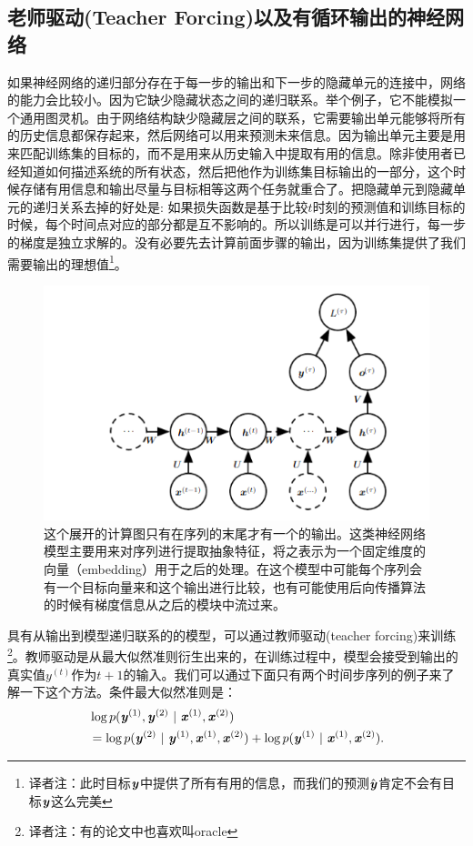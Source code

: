 \subsection{老师驱动(Teacher Forcing)以及有循环输出的神经网络}
\label{sec:10.2.1}
如果神经网络的递归部分存在于每一步的输出和下一步的隐藏单元的连接中，网络的能力会比较小。因为它缺少隐藏状态之间的递归联系。举个例子，它不能模拟一个通用图灵机。由于网络结构缺少隐藏层之间的联系，它需要输出单元能够将所有的历史信息都保存起来，然后网络可以用来预测未来信息。因为输出单元主要是用来匹配训练集的目标的，而不是用来从历史输入中提取有用的信息。除非使用者已经知道如何描述系统的所有状态，然后把他作为训练集目标输出的一部分，这个时候存储有用信息和输出尽量与目标相等这两个任务就重合了。把隐藏单元到隐藏单元的递归关系去掉的好处是: 如果损失函数是基于比较$t$时刻的预测值和训练目标的时候，每个时间点对应的部分都是互不影响的。所以训练是可以并行进行，每一步的梯度是独立求解的。没有必要先去计算前面步骤的输出，因为训练集提供了我们需要输出的理想值\footnote{译者注：此时目标$\boldsymbol{\mathit{y}}$中提供了所有有用的信息，而我们的预测$\hat{\boldsymbol{\mathit{y}}}$肯定不会有目标$\boldsymbol{\mathit{y}}$这么完美}。
\begin{figure}[htbp] %
   \centering
   \includegraphics[width=6in]{fig/chap10/10_5.PNG} 
   \caption{这个展开的计算图只有在序列的末尾才有一个的输出。这类神经网络模型主要用来对序列进行提取抽象特征，将之表示为一个固定维度的向量（embedding）用于之后的处理。在这个模型中可能每个序列会有一个目标向量来和这个输出进行比较，也有可能使用后向传播算法的时候有梯度信息从之后的模块中流过来。}
   \label{fig:10_5}
\end{figure}

具有从输出到模型递归联系的的模型，可以通过教师驱动(teacher forcing)来训练\footnote{译者注：有的论文中也喜欢叫oracle}。教师驱动是从最大似然准则衍生出来的，在训练过程中，模型会接受到输出的真实值$y^{(t)}$作为$t+1$的输入。我们可以通过下面只有两个时间步序列的例子来了解一下这个方法。条件最大似然准则是：
\begin{align}
 &\log p(\boldsymbol{\mathit{y}}^{(1)},\boldsymbol{\mathit{y}}^{(2)} ~|~ \boldsymbol{\mathit{x}}^{(1)}, \boldsymbol{\mathit{x}}^{(2)} ) \\
 &= \log  p(\boldsymbol{\mathit{y}}^{(2)} ~|~\boldsymbol{\mathit{y}}^{(1)}, \boldsymbol{\mathit{x}}^{(1)}, \boldsymbol{\mathit{x}}^{(2)} )  + \log p(\boldsymbol{\mathit{y}}^{(1)} ~|~ \boldsymbol{\mathit{x}}^{(1)}, \boldsymbol{\mathit{x}}^{(2)}) .
\end{align}

